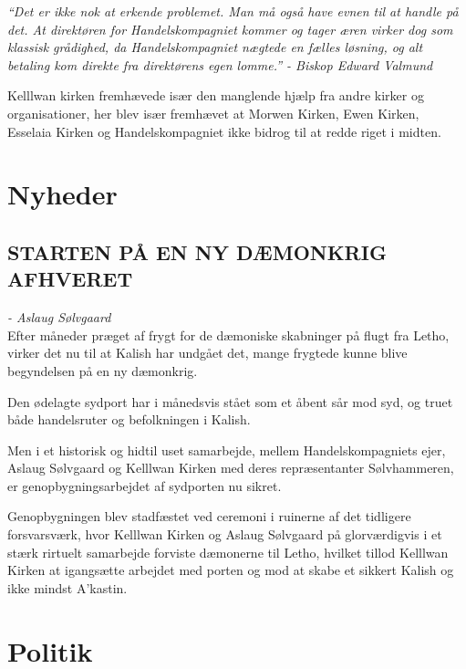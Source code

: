 \documentclass[letterpaper,12pt]{memoir}
\newenvironment{pullquote}
  {\begin{tcolorbox}[enhanced, breakable]\itshape\large}
  {\end{tcolorbox}}
\begin{document}
\begin{pullquote}
“Det er ikke nok at erkende problemet. Man må også have evnen til at handle på det. At direktøren for Handelskompagniet kommer og tager æren virker dog som klassisk grådighed, da Handelskompagniet nægtede en fælles løsning, og alt betaling kom direkte fra direktørens egen lomme.”
- Biskop Edward Valmund 
\end{pullquote}

\par\medskip

Kelllwan kirken fremhævede især den manglende hjælp fra andre kirker og organisationer, her blev især fremhævet at Morwen Kirken, Ewen Kirken, Esselaia Kirken og Handelskompagniet ikke bidrog til at redde riget i midten.

\section*{Nyheder}

\subsection*{STARTEN PÅ EN NY DÆMONKRIG AFHVERET}
\textit{- Aslaug Sølvgaard}\\
Efter måneder præget af frygt for de dæmoniske skabninger på flugt fra Letho, virker det nu til at Kalish har undgået det, mange frygtede kunne blive begyndelsen på en ny dæmonkrig.

\par\medskip
Den ødelagte sydport har i månedsvis stået som et åbent sår mod syd, og truet både handelsruter og befolkningen i Kalish. 

\par\medskip
Men i et historisk og hidtil uset samarbejde, mellem Handelskompagniets ejer, Aslaug Sølvgaard og Kelllwan Kirken med deres repræsentanter Sølvhammeren, er genopbygningsarbejdet af sydporten nu sikret. 

\par\medskip
Genopbygningen blev stadfæstet ved ceremoni i ruinerne af det tidligere forsvarsværk, hvor Kelllwan Kirken og Aslaug Sølvgaard på glorværdigvis i et stærk rirtuelt samarbejde forviste dæmonerne til Letho, hvilket tillod Kelllwan Kirken at igangsætte arbejdet med porten og mod at skabe et sikkert Kalish og ikke mindst A'kastin.

\section*{Politik}
\end{document}

